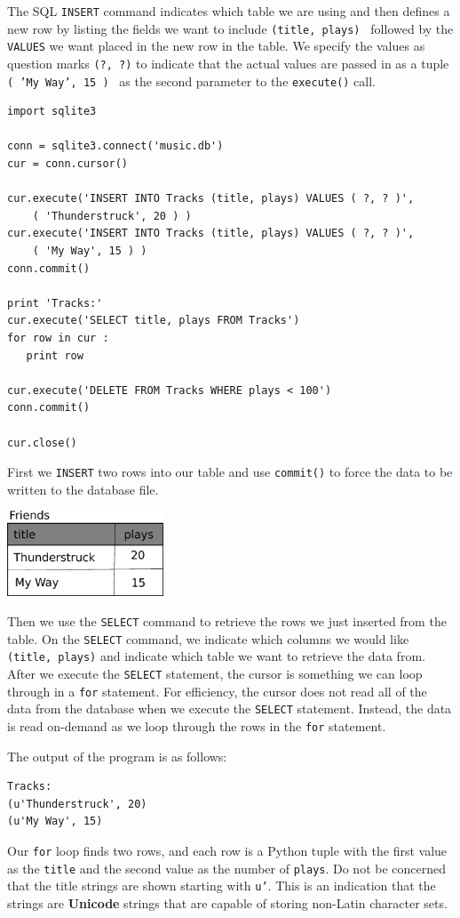 \documentclass[11pt]{book}
\begin{document}
The SQL {\tt INSERT} command indicates which table we are using 
and then defines a new row by listing the fields we want to 
include {\tt (title, plays) } followed by the {\tt VALUES} we want
placed in the new row in the table.   We specify the values
as question marks {\tt (?, ?)} to indicate that the actual 
values are passed in as a tuple {\tt ( 'My Way', 15 ) } as the
second parameter to the {\tt execute()} call.

\beforeverb
\begin{verbatim}
import sqlite3

conn = sqlite3.connect('music.db')
cur = conn.cursor()

cur.execute('INSERT INTO Tracks (title, plays) VALUES ( ?, ? )', 
    ( 'Thunderstruck', 20 ) )
cur.execute('INSERT INTO Tracks (title, plays) VALUES ( ?, ? )', 
    ( 'My Way', 15 ) )
conn.commit()

print 'Tracks:'
cur.execute('SELECT title, plays FROM Tracks')
for row in cur :
   print row

cur.execute('DELETE FROM Tracks WHERE plays < 100')
conn.commit()

cur.close()
\end{verbatim}
\afterverb
%
First we {\tt INSERT} two rows into our table and use {\tt commit()} 
to force the data to be written to the database file.

\beforefig
\centerline{\includegraphics[height=1.00in]{figs2/tracks.eps}}
\afterfig

Then we use the {\tt SELECT} command
to retrieve the rows we just inserted from the table.  
On the 
{\tt SELECT} command, we indicate which columns we would like {\tt (title, plays)}
and indicate which table we want to retrieve the data from.  After we 
execute the {\tt SELECT} statement, the cursor is something we can loop through
in a {\tt for} statement.   For efficiency,
the cursor does not read all of the data from the
database when we execute the {\tt SELECT} statement.  
Instead, the data is read on-demand
as we loop through the rows in the {\tt for} statement.

The output of the program is as follows:

\beforeverb
\begin{verbatim}
Tracks:
(u'Thunderstruck', 20)
(u'My Way', 15)
\end{verbatim}
\afterverb
%
Our {\tt for} loop finds two rows, and each row is a Python tuple with the
first value as the {\tt title} and the second value as the number of {\tt plays}.
Do not be concerned that the title strings are shown starting with 
{\tt u'}.  This is an indication that the strings are {\bf Unicode} strings
that are capable of storing non-Latin character sets.
\end{document}
